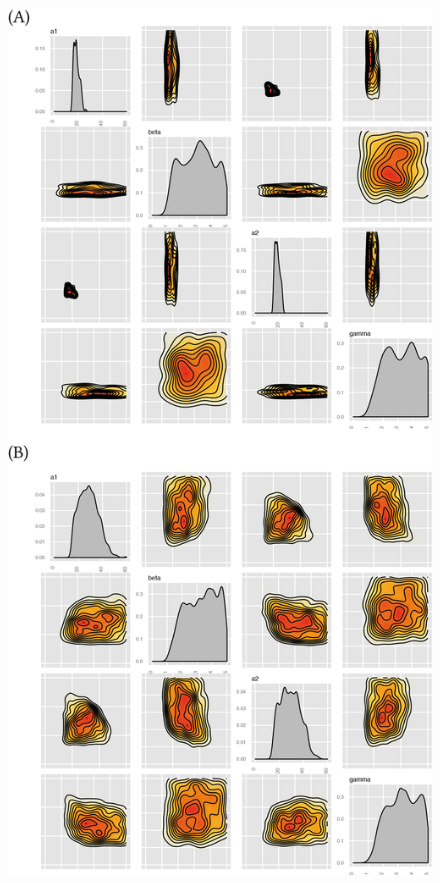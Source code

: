 {\begin{figure}[htbp]
\begin{center}
	\includegraphics[scale=0.8]{chapterStabilityFinder/images/gardner_posteriors.png}
	\caption[LoF caption]{\label{fig:gard_post}}

\end{center}
\end{figure}}
